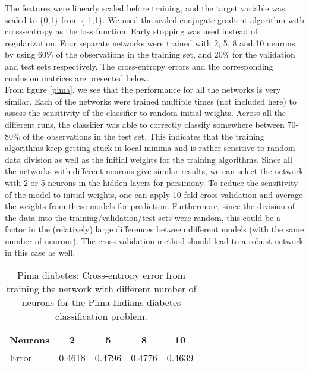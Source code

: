 \documentclass[paper=a4, fontsize=11pt]{scrartcl} %
\numberwithin{equation}{section} %
\begin{document}
The features were linearly scaled before training, and the target variable was scaled to \{0,1\} from \{-1,1\}. We used the scaled conjugate gradient algorithm with cross-entropy as the loss function. Early stopping was used instead of regularization. Four separate networks were trained with 2, 5, 8 and 10 neurons by using 60\% of the observations in the training set, and 20\% for the validation and test sets respectively. The cross-entropy errors and the corresponding confusion matrices are presented below.\\

From figure \ref{pima}, we see that the performance for all the networks is very similar. Each of the networks were trained multiple times (not included here) to assess the sensitivity of the classifier to random initial weights. Across all the different runs, the classifier was able to correctly classify somewhere between 70-80\% of the observations in the test set. This indicates that the training algorithms keep getting stuck in local minima and is rather sensitive to random data division as well as the initial weights for the training algorithms. Since all the networks with different neurons give similar results, we can select the network with 2 or 5 neurons in the hidden layers for parsimony. To reduce the sensitivity of the model to initial weights, one can apply 10-fold cross-validation and average the weights from these models for prediction. Furthermore, since the division of the data into the training/validation/test sets were random, this could be a factor in the (relatively) large differences between different models (with the same number of neurons). The cross-validation method should lead to a robust network in this case as well.\\

\begin{table}[H]
\centering
\begin{tabular}{lcccc}
\hline
Neurons & 2 & 5 & 8 & 10\\
\hline
Error & 0.4618 & 0.4796 & 0.4776 & 0.4639 \\
\hline
\end{tabular}
\caption{Pima diabetes: Cross-entropy error from training the network with different number of neurons for the Pima Indians diabetes classification problem.}
\label{cross}
\end{table}
\end{document}
